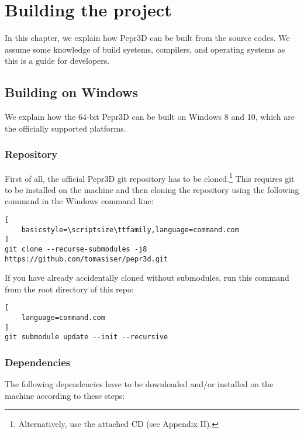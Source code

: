 \chapter{Building the project}
\label{ch:build}

In this chapter, we explain how Pepr3D can be built from the source codes.
We assume some knowledge of build systems, compilers, and operating systems as this is a guide for developers.

\section{Building on Windows}

We explain how the 64-bit Pepr3D can be built on Windows 8 and 10, which are the officially supported platforms.

\subsection{Repository}

First of all, the official Pepr3D git repository has to be cloned.\footnote{Alternatively, use the attached CD (see Appendix II).}
This requires git to be installed on the machine and then cloning the repository using the following command in the Windows command line:

\begin{lstlisting}[
    basicstyle=\scriptsize\ttfamily,language=command.com
]
git clone --recurse-submodules -j8 https://github.com/tomasiser/pepr3d.git
\end{lstlisting}

If you have already accidentally cloned without submodules, run this command from the root directory of this repo:

\begin{lstlisting}[
    language=command.com
]
git submodule update --init --recursive
\end{lstlisting}

\subsection{Dependencies}

The following dependencies have to be downloaded and/or installed on the machine according to these steps:


